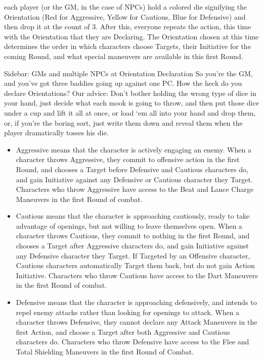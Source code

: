 \documentclass[oneside,11pt,english]{book}
\begin{document}
each player (or the GM, in the case of NPCs) hold a colored die signifying the Orientation (Red 
for Aggressive, Yellow for Cautious, Blue for Defensive) and then drop it at the count of 3. 
After this, everyone repeats the action, this time with the Orientation that they are Declaring. The 
Orientation chosen at this time determines the order in which characters choose Targets, their 
Initiative for the coming Round, and what special maneuvers are available in this first Round. 

 

{Sidebar: GMs and multiple NPCs at Orientation Declaration 
So you’re the GM, and you’ve got three baddies going up against one PC. How the heck do 
you declare Orientations? 
Our advice: Don’t bother holding the wrong type of dice in your hand, just decide what 
each mook is going to throw, and then put those dice under a cup and lift it all at once, or 
load ‘em all into your hand and drop them, or, if you’re the boring sort, just write them 
down and reveal them when the player dramatically tosses his die.} 

 
\begin{itemize}
\item Aggressive means that the character is actively engaging an enemy. When a character throws Aggressive, they commit to offensive action in the first Round, and chooses a 
Target before Defensive and Cautious characters do, and gain Initiative against any 
Defensive or Cautious character they Target. Characters who throw Aggressive have 
access to the Beat and Lance Charge Maneuvers in the first Round of combat. 
\item Cautious means that the character is approaching cautiously, ready to take advantage of 
openings, but not willing to leave themselves open. When a character throws Cautious, 
they commit to nothing in the first Round, and chooses a Target after Aggressive 
characters do, and gain Initiative against any Defensive character they Target. If Targeted 
by an Offensive character, Cautious characters automatically Target them back, but do 
not gain Action Initiative. Characters who throw Cautious have access to the Dart 
Maneuvers in the first Round of combat. 
\item Defensive means that the character is approaching defensively, and intends to repel 
enemy attacks rather than looking for openings to attack. When a character throws 
Defensive, they cannot declare any Attack Maneuvers in the first Action, and choose a 
Target after both Aggressive and Cautious characters do. Characters who throw 
Defensive have access to the Flee and Total Shielding Maneuvers in the first Round of 
Combat. 
\end{itemize}
 
\end{document}

